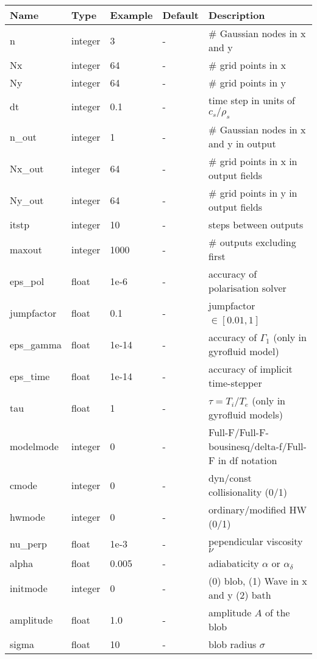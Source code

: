 \documentclass{hitec} %
\begin{document}
\begin{longtable}{llll>{\RaggedRight}p{7cm}}
\toprule
\rowcolor{gray!50}\textbf{Name} &  \textbf{Type} & \textbf{Example} & \textbf{Default} & \textbf{Description}  \\ \midrule
n      & integer & 3 & - &\# Gaussian nodes in x and y \\
Nx     & integer &64& - &\# grid points in x \\
Ny     & integer &64& - &\# grid points in y \\
dt     & integer &0.1& - &time step in units of $c_s/\rho_s$ \\
n\_out  & integer &1  & - &\# Gaussian nodes in x and y in output \\
Nx\_out & integer &64& - &\# grid points in x in output fields \\
Ny\_out & integer &64& - &\# grid points in y in output fields \\
itstp  & integer &10  & - &   steps between outputs \\
maxout & integer &1000& - &      \# outputs excluding first \\
eps\_pol   & float &1e-6   & - &  accuracy of polarisation solver \\
jumpfactor & float &0.1    & - &  jumpfactor $\in \left[0.01,1\right]$\ \\
eps\_gamma & float &1e-14  & - & accuracy of $\Gamma_1$ (only in gyrofluid model) \\
eps\_time  & float &1e-14  & - & accuracy of implicit time-stepper \\
tau        & float &1      & - & $\tau = T_i/T_e$ (only in gyrofluid models) \\
modelmode  & integer &0   & - & Full-F/Full-F-bousinesq/delta-f/Full-F in df notation \\
cmode      & integer &0   & - & dyn/const collisionality (0/1) \\
hwmode     & integer &0   & - & ordinary/modified HW (0/1) \\
nu\_perp   & float &1e-3  & - & pependicular viscosity $\nu$ \\
alpha      & float &0.005  & - & adiabaticity $\alpha$ or $\alpha_\delta$ \\
initmode   & integer &0    & - & (0) blob, (1) Wave in x and y (2) bath\\
amplitude  & float &1.0    & - & amplitude $A$ of the blob \\
sigma      & float &10     & - & blob radius $\sigma$ \\

\end{longtable}
\end{document}
